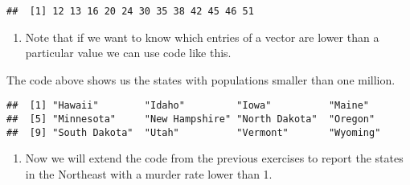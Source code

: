 \documentclass[
]{article}
\newenvironment{Shaded}{\begin{snugshade}}{\end{snugshade}}
\newcommand{\CommentTok}[1]{\textcolor[rgb]{0.56,0.35,0.01}{\textit{#1}}}
\newcommand{\DecValTok}[1]{\textcolor[rgb]{0.00,0.00,0.81}{#1}}
\newcommand{\NormalTok}[1]{#1}
\newcommand{\OperatorTok}[1]{\textcolor[rgb]{0.81,0.36,0.00}{\textbf{#1}}}
\newcommand{\StringTok}[1]{\textcolor[rgb]{0.31,0.60,0.02}{#1}}
\providecommand{\tightlist}{%
  \setlength{\itemsep}{0pt}\setlength{\parskip}{0pt}}
\begin{document}
\begin{verbatim}
##  [1] 12 13 16 20 24 30 35 38 42 45 46 51
\end{verbatim}

\begin{enumerate}
\def\labelenumi{\arabic{enumi}.}
\setcounter{enumi}{2}
\tightlist
\item
  Note that if we want to know which entries of a vector are lower than
  a particular value we can use code like this.
\end{enumerate}

\begin{Shaded}
\end{Shaded}

The code above shows us the states with populations smaller than one
million.

\begin{Shaded}
\end{Shaded}

\begin{verbatim}
##  [1] "Hawaii"        "Idaho"         "Iowa"          "Maine"        
##  [5] "Minnesota"     "New Hampshire" "North Dakota"  "Oregon"       
##  [9] "South Dakota"  "Utah"          "Vermont"       "Wyoming"
\end{verbatim}

\begin{enumerate}
\def\labelenumi{\arabic{enumi}.}
\setcounter{enumi}{3}
\tightlist
\item
  Now we will extend the code from the previous exercises to report the
  states in the Northeast with a murder rate lower than 1.
\end{enumerate}
\end{document}
